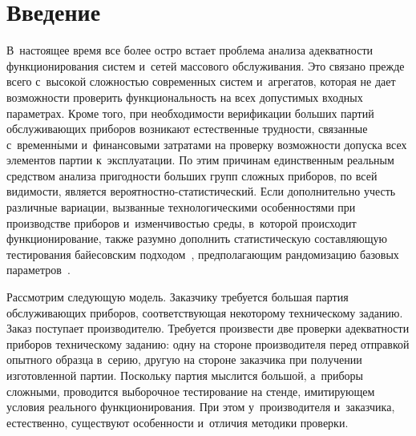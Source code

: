 
  
\vspace*{-6pt}



\thispagestyle{headings}

\begin{multicols}{2}

\label{st\stat}


\section{Введение}

В~настоящее время все более остро встает проб\-ле\-ма анализа 
адекватности функционирования сис\-тем и~сетей массового обслуживания.
 Это связано прежде всего с~высокой слож\-ностью со\-временных 
 сис\-тем и~агрегатов, которая не дает воз\-мож\-ности проверить функ\-цио\-наль\-ность 
 на всех допустимых входных па\-ра\-мет\-рах. Кроме того, при не\-об\-хо\-ди\-мости 
 верификации больших партий об\-слу\-жи\-ва\-ющих приборов возникают естественные 
 труд\-ности, связанные с~временн$\acute{\mbox{ы}}$ми и~финансовыми 
 затратами на проверку 
 воз\-мож\-ности допуска всех элементов партии к~эксплуатации. По этим\linebreak
  причинам 
 единственным реальным средством анали\-за пригодности больших групп слож\-ных 
 приборов, по всей видимости, является ве\-ро\-ят\-ност\-но-ста\-ти\-сти\-че\-ский. 
 Если дополнительно учесть различные вариации, вызванные технологическими 
 особенностями при производстве приборов и~изменчивостью среды, в~которой 
 происходит функционирование, также разумно дополнить статистическую
  со\-став\-ля\-ющую тестирования байесовским подходом~\cite{CSMIJ}, пред\-по\-ла\-га\-ющим 
  рандомизацию базовых па\-ра\-мет\-ров~\cite{KuSh2015}.

Рассмотрим следующую модель. Заказчику требуется большая партия обслуживающих 
приборов, соответствующая некоторому техническому заданию. Заказ поступает 
производителю. Требуется произвести две проверки адекватности приборов техническому 
заданию: одну на стороне производителя перед отправкой опытного образца в~серию, 
другую на стороне заказчика при получении изготовленной партии. Поскольку 
партия мыслится большой, а~приборы сложными, проводится выборочное 
тестирование на стенде, имитирующем условия реального функционирования. 
При этом у~производителя и~заказчика, естественно, существуют особенности и~отличия 
методики проверки.


\end{multicols}
